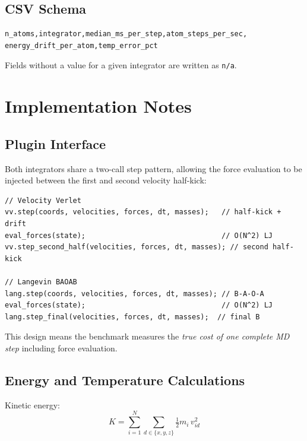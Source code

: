 \documentclass[11pt,a4paper]{article}
\theoremstyle{definition}
\theoremstyle{plain}
\newcommand{\half}{\tfrac{1}{2}}
\begin{document}
\subsection{CSV Schema}

\begin{lstlisting}[language={},basicstyle=\ttfamily\footnotesize]
n_atoms,integrator,median_ms_per_step,atom_steps_per_sec,
energy_drift_per_atom,temp_error_pct
\end{lstlisting}

Fields without a value for a given integrator are written as \texttt{n/a}.

\section{Implementation Notes}
\label{sec:impl}

\subsection{Plugin Interface}

Both integrators share a two-call step pattern, allowing the force
evaluation to be injected between the first and second velocity half-kick:

\begin{lstlisting}
// Velocity Verlet
vv.step(coords, velocities, forces, dt, masses);   // half-kick + drift
eval_forces(state);                                // O(N^2) LJ
vv.step_second_half(velocities, forces, dt, masses); // second half-kick

// Langevin BAOAB
lang.step(coords, velocities, forces, dt, masses); // B-A-O-A
eval_forces(state);                                // O(N^2) LJ
lang.step_final(velocities, forces, dt, masses);  // final B
\end{lstlisting}

This design means the benchmark measures the \emph{true cost of one
complete MD step} including force evaluation.

\subsection{Energy and Temperature Calculations}

Kinetic energy:
\begin{equation}
  K = \sum_{i=1}^{N}\sum_{d \in \{x,y,z\}}
	  \half m_{i}\,v_{id}^{2}
\end{equation}
\end{document}
